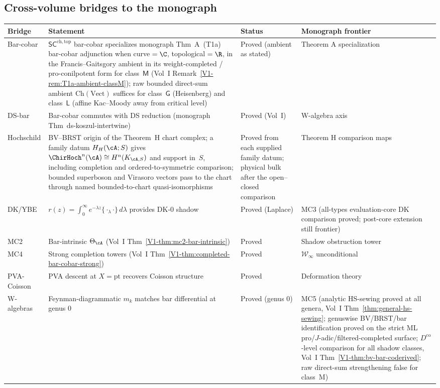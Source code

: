\subsection{Cross-volume bridges to the monograph}

\begin{center}
\renewcommand{\arraystretch}{1.3}
\begin{tabular}{p{}p{}p{}p{}}
\textbf{Bridge} & \textbf{Statement} & \textbf{Status} & \textbf{Monograph frontier} \\
\hline
Bar-cobar & $\mathsf{SC}^{\mathrm{ch,top}}$ bar-cobar specializes monograph Thm~A~(T1a) bar-cobar adjunction when curve${}=\C$, topological${}=\R$, in the Francis--Gaitsgory ambient in its weight-completed / pro-conilpotent form for class~$\mathsf{M}$ (Vol~I Remark~\ref*{V1-rem:T1a-ambient-classM}); raw bounded direct-sum ambient $\mathrm{Ch}(\mathrm{Vect})$ suffices for class~$\mathsf{G}$ (Heisenberg) and class~$\mathsf{L}$ (affine Kac--Moody away from critical level) & Proved (ambient as stated) & Theorem A specialization \\
DS-bar & Bar-cobar commutes with DS reduction (monograph Thm~ds-koszul-intertwine) & Proved (Vol~I) & W-algebra axis \\
Hochschild & BV--BRST origin of the Theorem~H chart complex; a family datum $H_H(\cA;S)$ gives $\ChirHoch^n(\cA)\cong H^n(K_{\cA,S})$ and support in~$S$, including completion and ordered-to-symmetric comparison; bounded superboson and Virasoro vectors pass to the chart through named bounded-to-chart quasi-isomorphisms & Proved from each supplied family datum; physical bulk after the open--closed comparison & Theorem H comparison maps \\
DK/YBE & $r(z) = \int_0^\infty e^{-\lambda z}\{\cdot_\lambda\cdot\}\,d\lambda$ provides DK-0 shadow & Proved (Laplace) & MC3 (all-types evaluation-core DK comparison proved; post-core extension still frontier) \\
MC2 & Bar-intrinsic $\Theta_\cA$ (Vol~I Thm~\ref*{V1-thm:mc2-bar-intrinsic}) & Proved & Shadow obstruction tower \\
MC4 & Strong completion towers (Vol~I Thm~\ref*{V1-thm:completed-bar-cobar-strong}) & Proved & $\mathcal{W}_\infty$ unconditional \\
PVA-Coisson & PVA descent at $X = \mathrm{pt}$ recovers Coisson structure & Proved & Deformation theory \\
W-algebras & Feynman-diagrammatic $m_k$ matches bar differential at genus 0 & Proved (genus 0) & MC5 (analytic HS-sewing proved at all genera, Vol~I Thm~\ref*{thm:general-hs-sewing}; genuswise BV/BRST/bar identification proved on the strict ML pro/$J$-adic/filtered-completed surface; $D^{\mathrm{co}}$-level comparison for all shadow classes, Vol~I Thm~\ref*{V1-thm:bv-bar-coderived}; raw direct-sum strengthening false for class~M) \\

\end{tabular}
\end{center}
